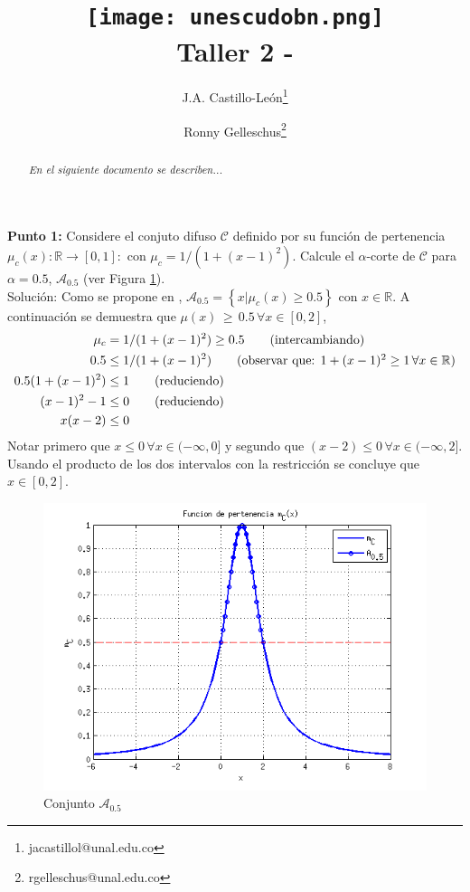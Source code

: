 \documentclass[10pt,onecolumn,twoside,letterpaper]{article}
\title{\vspace{-0.8cm}\texttt{[image: unescudobn.png]}\\\vspace{-0.0cm}
  \LARGE \textbf{Taller 2 - }}
\author{J.A. Castillo-Le\'on\thanks{jacastillol@unal.edu.co} \and Ronny Gelleschus\thanks{rgelleschus@unal.edu.co}}
\date{}
\begin{document}
\maketitle
\begin{abstract}\noindent\small\textit{En el siguiente documento se describen...}
\end{abstract}\vspace{1cm}
\par{\bf \large Punto 1:} Considere el conjuto difuso $\mathcal{C}$ definido por su funci\'on de pertenencia $\mu_c(x):\mathbb{R}\to[0,1]:$ con $\mu_c=1/(1+(x-1)^2)$. Calcule el $\alpha$-corte de $\mathcal{C}$ para $\alpha=0.5$, $\mathcal{A}_{0.5}$ (ver Figura \ref{fig:Acut05}).\\
Soluci\'on: Como se propone en \cite{Babuska1999}, $\mathcal{A}_{0.5}=\left\{x|\mu_c(x)\geq0.5\right\}$ con $x\in\mathbb{R}$. A continuaci\'on se demuestra que $\mu(x)\,\geq\,0.5\,\forall x \in [0,2]$,
\begin{align*}\small
  \mu_c&=1/(1+(x-1)^2)\geq 0.5 \tag{intercambiando}
  \\0.5&\leq 1/(1+(x-1)^2) \tag{observar que: $1+(x-1)^2\geq 1\,\forall x\in\mathbb{R}$}
  \\0.5(1+(x-1)^2)&\leq 1 \tag{reduciendo}
  \\(x-1)^2-1&\leq 0 \tag{reduciendo}
  \\x(x-2)&\leq 0 
\end{align*}
Notar primero que $x\leq 0\,\forall x\in(-\infty,0]$ y segundo que $(x-2)\leq0\,\forall x\in(-\infty,2]$. Usando el producto de los dos intervalos con la restricci\'on se concluye que $x\in [0,2]$.
\begin{figure}[H]
 \centering
 \includegraphics[scale=0.6]{A_05.png}
 \caption{Conjunto $\mathcal{A}_{0.5}$}
 \label{fig:Acut05}
\end{figure}
\end{document}
